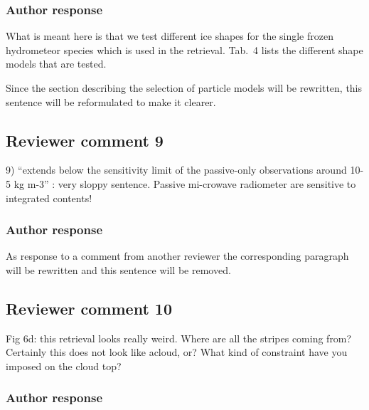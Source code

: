 \documentclass[11pt]{scrartcl}
\begin{document}
\subsubsection*{Author response}

What is meant here is that we test different ice shapes for the single frozen
hydrometeor species which is used in the retrieval. Tab.~4 lists the different
shape models that are tested.

Since the section describing the selection of particle models will be rewritten,
this sentence will be reformulated to make it clearer.

\subsection*{Reviewer comment 9}

9) “extends below the sensitivity limit of the passive-only observations around
10-5 kg m-3” : very sloppy sentence. Passive mi-crowave radiometer are sensitive
to integrated contents!

\subsubsection*{Author response}

As response to a comment from another reviewer the corresponding paragraph will be
rewritten and this sentence will be removed.



\subsection*{Reviewer comment 10}

 Fig 6d: this retrieval looks really weird. Where are all the stripes coming
 from? Certainly this does not look like acloud, or? What kind of constraint
 have you imposed on the cloud top?

\subsubsection*{Author response}
\end{document}
